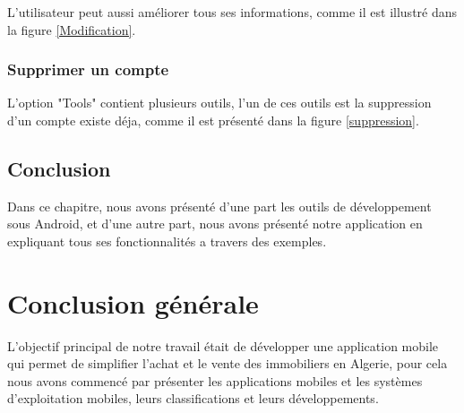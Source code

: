 \documentclass[french,a4,12pt]{report}
\begin{document}
L'utilisateur peut aussi améliorer tous ses informations, comme il est illustré dans la figure \ref{Modification}.  

\begin{tcolorbox}[colframe=green!75,rightrule=0.5cm,leftrule=0.5cm,]
	\centering
\subsection{Supprimer un compte }
\end{tcolorbox}
L'option "Tools" contient plusieurs outils, l'un de ces outils est la suppression d'un compte existe déja, comme il est présenté dans la figure \ref{suppression}.    
\newpage
\begin{tcolorbox}[leftrule=3mm]
\section{Conclusion}
\end{tcolorbox}
Dans ce chapitre, nous avons présenté d'une part les outils de développement sous
Android, et d'une autre part, nous avons présenté notre application en expliquant tous ses fonctionnalités a travers des exemples.


\chapter*{Conclusion générale}
\lhead{}
\cfoot{\bfseries \thepage}

L'objectif principal de notre travail était de développer une application mobile qui permet de simplifier l'achat et le vente des immobiliers en Algerie, pour cela nous avons commencé par présenter les applications mobiles et les systèmes d'exploitation mobiles, leurs classifications et leurs développements. 
\end{document}
